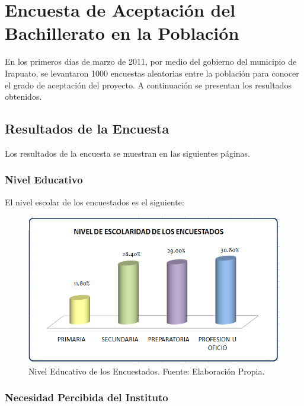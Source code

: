 \chapter{Encuesta de Aceptación del Bachillerato en la Población}

En los primeros días de marzo de 2011, por medio del gobierno del municipio de Irapuato, se levantaron 1000 encuestas aleatorias entre la población para conocer el grado de aceptación del proyecto. A continuación se presentan los resultados obtenidos.

\section{Resultados de la Encuesta}

Los resultados de la encuesta se muestran en las siguientes páginas.

\clearpage
\subsection{Nivel Educativo}

El nivel escolar de los encuestados es el siguiente:

\begin{figure}[h!]
	\centering
	\includegraphics[scale=0.5]{images/encuesta_nivel_educativo}
	\caption{Nivel Educativo de los Encuestados. Fuente: Elaboración Propia.}
	\label{fig:Encuesta:NivelEducativo}
\end{figure}



\clearpage
\subsection{Necesidad Percibida del Instituto}

